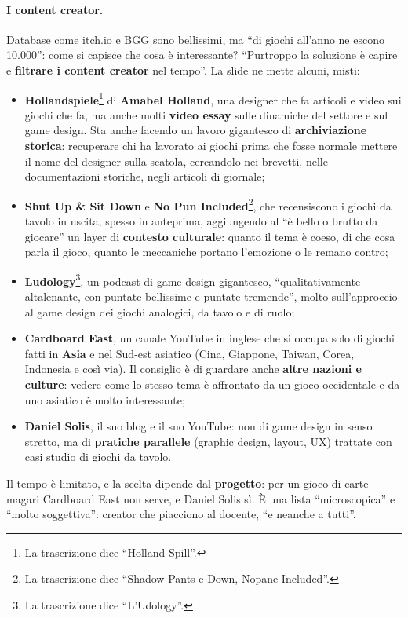 \paragraph{I content creator.} Database come itch.io e BGG sono bellissimi, ma
``di giochi all'anno ne escono 10.000'': come si capisce che cosa è interessante?
``Purtroppo la soluzione è capire e \textbf{filtrare i content creator} nel tempo''. La
slide ne mette alcuni, misti:
\begin{itemize}
  \item \textbf{Hollandspiele}\footnote{La trascrizione dice ``Holland Spill''.} di
        \textbf{Amabel Holland}, una designer che fa articoli e video sui giochi che fa,
        ma anche molti \textbf{video essay} sulle dinamiche del settore e sul game
        design. Sta anche facendo un lavoro gigantesco di \textbf{archiviazione
        storica}: recuperare chi ha lavorato ai giochi prima che fosse normale mettere
        il nome del designer sulla scatola, cercandolo nei brevetti, nelle
        documentazioni storiche, negli articoli di giornale;
  \item \textbf{Shut Up \& Sit Down} e \textbf{No Pun Included}\footnote{La
        trascrizione dice ``Shadow Pants e Down, Nopane Included''.}, che recensiscono
        i giochi da tavolo in uscita, spesso in anteprima, aggiungendo al ``è bello o
        brutto da giocare'' un layer di \textbf{contesto culturale}: quanto il tema è
        coeso, di che cosa parla il gioco, quanto le meccaniche portano l'emozione o le
        remano contro;
  \item \textbf{Ludology}\footnote{La trascrizione dice ``L'Udology''.}, un podcast di
        game design gigantesco, ``qualitativamente altalenante, con puntate bellissime
        e puntate tremende'', molto sull'approccio al game design dei giochi
        analogici, da tavolo e di ruolo;
  \item \textbf{Cardboard East}, un canale YouTube in inglese che si occupa solo di
        giochi fatti in \textbf{Asia} e nel Sud-est asiatico (Cina, Giappone, Taiwan,
        Corea, Indonesia e così via). Il consiglio è di guardare anche \textbf{altre
        nazioni e culture}: vedere come lo stesso tema è affrontato da un gioco
        occidentale e da uno asiatico è molto interessante;
  \item \textbf{Daniel Solis}, il suo blog e il suo YouTube: non di game design in
        senso stretto, ma di \textbf{pratiche parallele} (graphic design, layout, UX)
        trattate con casi studio di giochi da tavolo.
\end{itemize}
Il tempo è limitato, e la scelta dipende dal \textbf{progetto}: per un gioco di carte
magari Cardboard East non serve, e Daniel Solis sì. È una lista ``microscopica'' e
``molto soggettiva'': creator che piacciono al docente, ``e neanche a tutti''.

